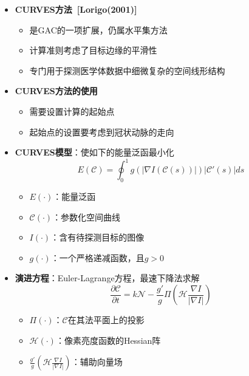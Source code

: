 \begin{frame}
\begin{itemize}
\item \textbf{CURVES方法~[Lorigo(2001)]}
\begin{itemize}
\item 是GAC的一项扩展，仍属水平集方法
\item 计算准则考虑了目标边缘的平滑性
\item 专门用于探测医学体数据中细微复杂的空间线形结构
\end{itemize}
\pause \item \textbf{CURVES方法的使用}
\begin{itemize}
\item 需要设置计算的起始点
\item 起始点的设置要考虑到冠状动脉的走向
\end{itemize}
\end{itemize}
\end{frame}

\begin{frame}
\begin{itemize}
\item \textbf{CURVES模型}：使如下的能量泛函最小化
\begin{equation*}
E(\mathcal C) = \oint_0^1 g\left( \left| \nabla I \left( \mathcal{C} \left(  s \right) \right) \right| \right) \left| \mathcal{C}'\left( s \right) \right| ds
\end{equation*}
\begin{itemize}
\item $E(\cdot)$：能量泛函
\item $\mathcal{C}(\cdot)$：参数化空间曲线
\item $I(\cdot)$：含有待探测目标的图像
\item $g(\cdot)$：一个严格递减函数，且$g > 0$
\end{itemize}
\end{itemize}
\end{frame}

\begin{frame}
\begin{itemize}
\item \textbf{演进方程}：Euler-Lagrange方程，最速下降法求解
\begin{equation*}
\frac{\partial \mathcal{C}}{\partial t} = k \mathcal{N} - \frac{g'}{g} \varPi \left( \mathcal{H} \frac{\nabla I}{\left| \nabla I \right|} \right)
\end{equation*}
\begin{itemize}
\item $\varPi(\cdot)$：$\mathcal{C}$在其法平面上的投影
\item $\mathcal{H}(\cdot)$：像素亮度函数的Hessian阵
\item $\frac{g'}{g} \left( \mathcal{H} \frac{\nabla I}{\left| \nabla I \right|} \right)$：辅助向量场
\end{itemize}
\end{itemize}
\end{frame}

